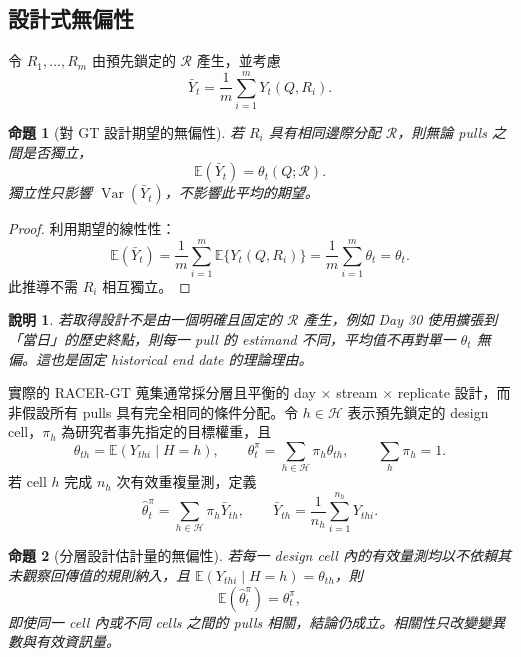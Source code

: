 \documentclass[12pt,a4paper,oneside]{article}
\newtheorem{proposition}{命題}[section]
\newtheorem{remark}{說明}[section]
\newcommand{\E}{\mathbb{E}}
\newcommand{\Var}{\operatorname{Var}}
\begin{document}
\subsection{設計式無偏性}

令 $R_1,\ldots,R_m$ 由預先鎖定的 $\mathcal{R}$ 產生，並考慮
\begin{equation}
\bar Y_t=\frac{1}{m}\sum_{i=1}^{m}Y_t(Q,R_i).
\end{equation}

\begin{proposition}[對 GT 設計期望的無偏性]
若 $R_i$ 具有相同邊際分配 $\mathcal{R}$，則無論 pulls 之間是否獨立，
\begin{equation}
\E(\bar Y_t)=\theta_t(Q;\mathcal{R}).
\end{equation}
獨立性只影響 $\Var(\bar Y_t)$，不影響此平均的期望。
\end{proposition}

\begin{proof}
利用期望的線性性：
\[
\E(\bar Y_t)=\frac{1}{m}\sum_{i=1}^{m}\E\{Y_t(Q,R_i)\}
=\frac{1}{m}\sum_{i=1}^{m}\theta_t=\theta_t.
\]
此推導不需 $R_i$ 相互獨立。
\end{proof}

\begin{remark}
若取得設計不是由一個明確且固定的 $\mathcal{R}$ 產生，例如 Day 30 使用擴張到「當日」的歷史終點，則每一 pull 的 estimand 不同，平均值不再對單一 $\theta_t$ 無偏。這也是固定 historical end date 的理論理由。
\end{remark}

實際的 RACER-GT 蒐集通常採分層且平衡的 day $\times$ stream $\times$ replicate 設計，而非假設所有 pulls 具有完全相同的條件分配。令 $h\in\mathcal{H}$ 表示預先鎖定的 design cell，$\pi_h$ 為研究者事先指定的目標權重，且
\begin{equation}
\theta_{th}=\E(Y_{thi}\mid H=h),
\qquad
\theta_t^{\pi}=\sum_{h\in\mathcal{H}}\pi_h\theta_{th},
\qquad \sum_h\pi_h=1.
\label{eq:stratifiedestimand}
\end{equation}
若 cell $h$ 完成 $n_h$ 次有效重複量測，定義
\begin{equation}
\widehat\theta_t^{\pi}
=\sum_{h\in\mathcal{H}}\pi_h\bar Y_{th},
\qquad
\bar Y_{th}=\frac{1}{n_h}\sum_{i=1}^{n_h}Y_{thi}.
\label{eq:stratifiedestimator}
\end{equation}

\begin{proposition}[分層設計估計量的無偏性]
若每一 design cell 內的有效量測均以不依賴其未觀察回傳值的規則納入，且 $\E(Y_{thi}\mid H=h)=\theta_{th}$，則
\begin{equation}
\E(\widehat\theta_t^{\pi})=\theta_t^{\pi},
\end{equation}
即使同一 cell 內或不同 cells 之間的 pulls 相關，結論仍成立。相關性只改變變異數與有效資訊量。
\end{proposition}
\end{document}
